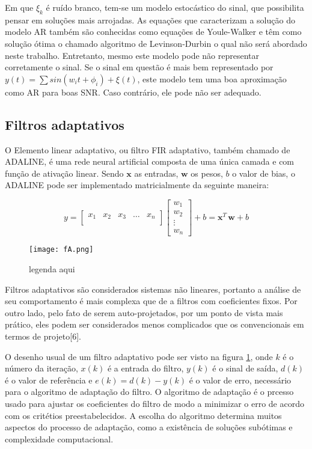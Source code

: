 Em que $\xi_k$ é ruído branco, tem-se um modelo estocástico do sinal, que possibilita pensar em soluções mais arrojadas. As equações que caracterizam a solução do modelo AR também são conhecidas como equações de Youle-Walker e têm como solução ótima o chamado algoritmo de Levinson-Durbin \cite{huang2001spoken} o qual não será abordado neste trabalho. Entretanto, mesmo este modelo pode não representar corretamente o sinal. Se o sinal em questão é mais bem representado por $y(t)=\sum sin(w_it+\phi_i)+\xi(t)$, este modelo tem uma boa aproximação como AR para boas SNR. Caso contrário, ele pode não ser adequado.

\subsection{Filtros adaptativos}

\indent O Elemento linear adaptativo, ou filtro FIR adaptativo, também chamado de ADALINE, é uma rede neural artificial composta de uma única camada e com função de ativação linear. Sendo $\boldsymbol{x}$ as entradas, $\boldsymbol{w}$ os pesos, $b$ o valor de bias, o ADALINE pode ser implementado matricialmente da seguinte maneira:


\begin{equation}
y=
\begin{bmatrix}
x_{1} & x_{2} & x_{3} & \dots & x_{n} \\
\end{bmatrix}
\begin{bmatrix}
w_{1}  \\
w_{2}  \\
\vdots  \\
w_{n} 
\end{bmatrix}
+ b = \boldsymbol{x}^T \, \boldsymbol{w}+b
\end{equation}

\begin{figure}[h]
	\centering
	\texttt{[image: fA.png]}
	\caption{legenda aqui}
	\label{fig:filtroAdaptativo}
\end{figure}

\indent Filtros adaptativos são considerados sistemas não lineares, portanto a análise de seu comportamento é mais complexa que de a filtros com coeficientes fixos. Por outro lado, pelo fato de serem auto-projetados, por um ponto de vista mais prático, eles podem ser considerados menos complicados que os convencionais em termos de projeto[6].

\indent O desenho usual de um filtro adaptativo pode ser visto na figura \ref{fig:filtroAdaptativo}, onde $k$ é o número da iteração, $x(k)$ é a entrada do filtro, $y(k)$ é o sinal de saída, $d(k)$ é o valor de referência e $e(k)=d(k)-y(k)$ é o valor de erro, necessário para o algoritmo de adaptação do filtro. O algoritmo de adaptação é o prcesso usado para ajustar os coeficientes do filtro de modo a minimizar o erro de acordo com os critétios preestabelecidos. A escolha do algoritmo determina muitos aspectos do processo de adaptação, como a existência de soluções subótimas e complexidade computacional.

